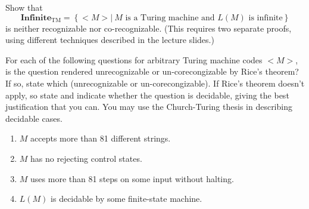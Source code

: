 \documentclass[12pt,letterpaper,boxed,cm]{hmcpset}
\newcommand{\set}[1]{\left\{#1\right\}}
\begin{document}
\begin{problem}[5.]
    [10 points] Show that 
    \[
        \textbf{Infinite}_{\text{TM}} = \set{<M> |~M \text{ is a Turing machine and $L(M)$ is infinite}}
    \]
    is neither recognizable nor co-recognizable. (This requires two separate proofs, using different techniques described in the lecture slides.)
\end{problem}

\begin{solution}
    \vfill
\end{solution}
\newpage

\begin{problem}[6.]
    [8 points] For each of the following questions for arbitrary Turing machine codes $<M>$, is the question rendered unrecognizable or un-corecongizable by Rice's theorem?  If so, state which (unrecognizable or un-corecongizable). If Rice's theorem doesn't apply, so state and indicate whether the question is decidable, giving the best justification that you can. You may use the Church-Turing thesis in describing decidable cases.
    \begin{enumerate}[label=\alph*.]
        \item $M$ accepts more than 81 different strings.
        \item $M$ has no rejecting control states.
        \item $M$ uses more than 81 steps on some input without halting.
        \item $L(M)$ is decidable by some finite-state machine.
    \end{enumerate}
\end{problem}

\begin{solution}
    \vfill
\end{solution}
\newpage
\end{document}
